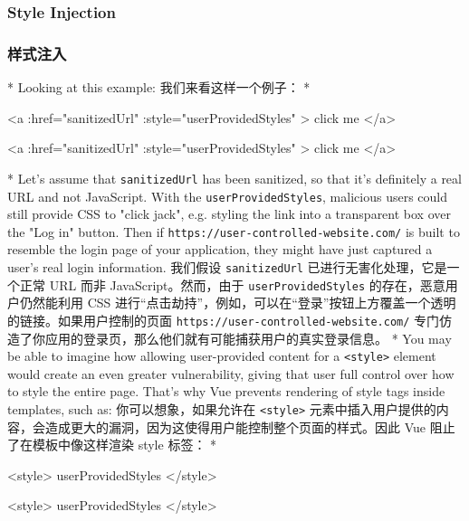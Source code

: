 \begin{paracol}{2}
\subsubsection{Style Injection}
\switchcolumn
\subsubsection{样式注入}
\switchcolumn[0]*%
Looking at this example:
\switchcolumn
我们来看这样一个例子：
\switchcolumn[0]*%
\begin{codeHtml}
<a
  :href="sanitizedUrl"
  :style="userProvidedStyles"
>
  click me
</a>
\end{codeHtml}
\switchcolumn
\begin{codeHtml}
<a
  :href="sanitizedUrl"
  :style="userProvidedStyles"
>
  click me
</a>
\end{codeHtml}
\switchcolumn[0]*%
Let's assume that \texttt{sanitizedUrl} has been sanitized, so that it's
definitely a real URL and not JavaScript. With the
\texttt{userProvidedStyles}, malicious users could still provide CSS to
"click jack", e.g. styling the link into a transparent box over the "Log
in" button. Then if \texttt{https://user-controlled-website.com/} is
built to resemble the login page of your application, they might have
just captured a user's real login information.
\switchcolumn
我们假设 \texttt{sanitizedUrl} 已进行无害化处理，它是一个正常 URL 而非
JavaScript。然而，由于 \texttt{userProvidedStyles}
的存在，恶意用户仍然能利用 CSS
进行``点击劫持''，例如，可以在``登录''按钮上方覆盖一个透明的链接。如果用户控制的页面
\texttt{https://user-controlled-website.com/}
专门仿造了你应用的登录页，那么他们就有可能捕获用户的真实登录信息。
\switchcolumn[0]*%
You may be able to imagine how allowing user-provided content for a
\texttt{\textless{}style\textgreater{}} element would create an even
greater vulnerability, giving that user full control over how to style
the entire page. That's why Vue prevents rendering of style tags inside
templates, such as:
\switchcolumn
你可以想象，如果允许在 \texttt{\textless{}style\textgreater{}}
元素中插入用户提供的内容，会造成更大的漏洞，因为这使得用户能控制整个页面的样式。因此
Vue 阻止了在模板中像这样渲染 style 标签：
\switchcolumn[0]*%
\begin{codeHtml}
<style>{{ userProvidedStyles }}</style>
\end{codeHtml}
\switchcolumn
\begin{codeHtml}
<style>{{ userProvidedStyles }}</style>
\end{codeHtml}

\end{paracol}
